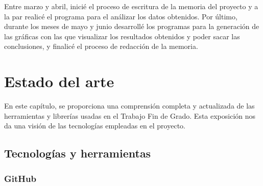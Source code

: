 \documentclass[a4paper, 12pt]{book}
\begin{document}
Entre marzo y abril, inicié el proceso de escritura de la memoria del proyecto y a la par realicé el programa para el análizar los datos obtenidos. 
Por último, durante los meses de mayo y junio desarrollé los programas para la generación de las gráficas con las que visualizar los resultados obtenidos y poder sacar las conclusiones, y finalicé el proceso de redacción de la memoria. 


\cleardoublepage
\chapter{Estado del arte}
\label{chap:estado}

En este capítulo, se proporciona una comprensión completa y actualizada de las herramientas y librerías usadas en el Trabajo Fin de Grado.
Esta exposición nos da una visión de las tecnologías empleadas en el proyecto.

\section{Tecnologías y herramientas} %
\label{sec:tecnologías y herramienta}

\subsection{GitHub} %
\label{sec:github} %
\end{document}
